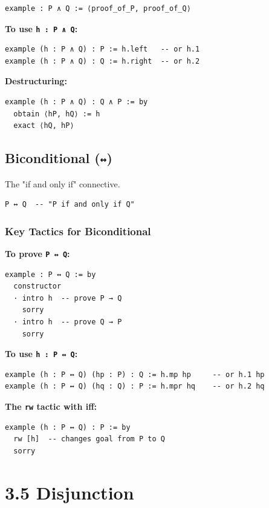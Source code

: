 \documentclass{amsart}
\theoremstyle{plain}
\theoremstyle{definition}
\theoremstyle{remark}
\begin{document}
\begin{lstlisting}[language=lean]
example : P ∧ Q := ⟨proof_of_P, proof_of_Q⟩
\end{lstlisting}
\textbf{To use \lstinline{h : P ∧ Q}:}

\begin{lstlisting}[language=lean]
example (h : P ∧ Q) : P := h.left   -- or h.1
example (h : P ∧ Q) : Q := h.right  -- or h.2
\end{lstlisting}
\textbf{Destructuring:}

\begin{lstlisting}[language=lean]
example (h : P ∧ Q) : Q ∧ P := by
  obtain ⟨hP, hQ⟩ := h
  exact ⟨hQ, hP⟩
\end{lstlisting}
\subsection{Biconditional (\lstinline{↔})}

The "if and only if" connective.

\begin{lstlisting}[language=lean]
P ↔ Q  -- "P if and only if Q"
\end{lstlisting}
\subsubsection{Key Tactics for Biconditional}

\textbf{To prove \lstinline{P ↔ Q}:}

\begin{lstlisting}[language=lean]
example : P ↔ Q := by
  constructor
  · intro h  -- prove P → Q
    sorry
  · intro h  -- prove Q → P
    sorry
\end{lstlisting}
\textbf{To use \lstinline{h : P ↔ Q}:}

\begin{lstlisting}[language=lean]
example (h : P ↔ Q) (hp : P) : Q := h.mp hp     -- or h.1 hp
example (h : P ↔ Q) (hq : Q) : P := h.mpr hq    -- or h.2 hq
\end{lstlisting}
\textbf{The \lstinline{rw} tactic with iff:}

\begin{lstlisting}[language=lean]
example (h : P ↔ Q) : P := by
  rw [h]  -- changes goal from P to Q
  sorry
\end{lstlisting}
\section{3.5 Disjunction}
\end{document}
